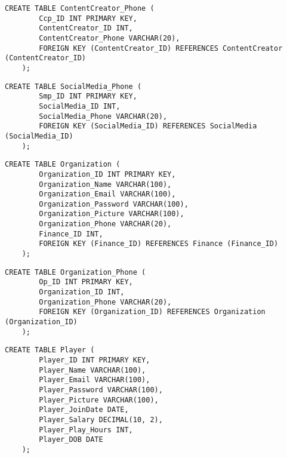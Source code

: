     \begin{lstlisting}[caption={Create ContentCreator Phone table}, label={lst:create_contentcreator_phone}]
    CREATE TABLE ContentCreator_Phone (
        Ccp_ID INT PRIMARY KEY,
        ContentCreator_ID INT,
        ContentCreator_Phone VARCHAR(20),
        FOREIGN KEY (ContentCreator_ID) REFERENCES ContentCreator (ContentCreator_ID)
    );
    \end{lstlisting}
    \clearpage
    \begin{lstlisting}[caption={Create SocialMedia Phone table}, label={lst:create_socialmedia_phone}]
    CREATE TABLE SocialMedia_Phone (
        Smp_ID INT PRIMARY KEY,
        SocialMedia_ID INT,
        SocialMedia_Phone VARCHAR(20),
        FOREIGN KEY (SocialMedia_ID) REFERENCES SocialMedia (SocialMedia_ID)
    );
    \end{lstlisting}
    \begin{lstlisting}[caption={Create Organization table}, label={lst:create_organization}]
    CREATE TABLE Organization (
        Organization_ID INT PRIMARY KEY,
        Organization_Name VARCHAR(100),
        Organization_Email VARCHAR(100),
        Organization_Password VARCHAR(100),
        Organization_Picture VARCHAR(100),
        Organization_Phone VARCHAR(20),
        Finance_ID INT,
        FOREIGN KEY (Finance_ID) REFERENCES Finance (Finance_ID)
    );
    \end{lstlisting}
    
    \begin{lstlisting}[caption={Create Organization Phone table}, label={lst:create_organization_phone}]
    CREATE TABLE Organization_Phone (
        Op_ID INT PRIMARY KEY,
        Organization_ID INT,
        Organization_Phone VARCHAR(20),
        FOREIGN KEY (Organization_ID) REFERENCES Organization (Organization_ID)
    );
    \end{lstlisting}
    
    \begin{lstlisting}[caption={Create Player table}, label={lst:create_player}]
    CREATE TABLE Player (
        Player_ID INT PRIMARY KEY,
        Player_Name VARCHAR(100),
        Player_Email VARCHAR(100),
        Player_Password VARCHAR(100),
        Player_Picture VARCHAR(100),
        Player_JoinDate DATE,
        Player_Salary DECIMAL(10, 2),
        Player_Play_Hours INT,
        Player_DOB DATE
    );
    \end{lstlisting}
    
